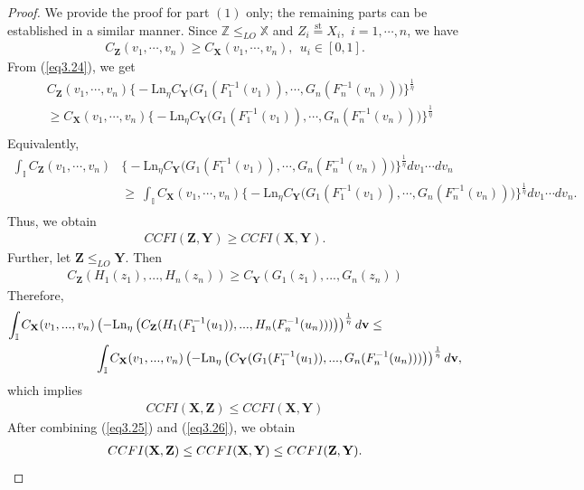 \documentclass[12pt, a4paper]{article}
\numberwithin{equation}{section}
\begin{document}
\begin{proof}
We provide the proof for part $(1)$ only; the remaining parts can be established in a similar manner.
 Since $\mathbb{Z}\le_{LO}\mathbb{X}$ and $Z_i\overset{\mathrm{st}}{=}X_i$,~$i=1,\cdots,n$, we have 
\begin{align}\label{eq3.24}
C_\textbf{Z}(v_1,\cdots,v_n)\ge C_\textbf{X}(v_1,\cdots,v_n),~~u_i\in[0,1].
\end{align}
 From (\ref{eq3.24}), we get
\begin{align*}
& C_\textbf{Z}(v_1,\cdots,v_n)\Big\{-\mathrm{Ln}_\eta C_\textbf{Y}\big(G_1(F^{-1}_1(v_1)),\cdots, G_n(F^{-1}_n(v_n))\big)\Big\}^{\frac{1}{\eta}}\nonumber\\
&\ge C_\textbf{X}(v_1,\cdots,v_n)\Big\{-\mathrm{Ln}_\eta C_\textbf{Y}\big(G_1(F^{-1}_1(v_1)),\cdots, G_n(F^{-1}_n(v_n))\big)\Big\}^{\frac{1}{\eta}}\nonumber\\
\end{align*}
Equivalently,
\begin{align*}
	\int_{\mathbb I}C_\textbf{Z}(v_1,\cdots,v_n)&\Big\{-\mathrm{Ln}_\eta C_\textbf{Y}\big(G_1(F^{-1}_1(v_1)),\cdots, G_n(F^{-1}_n(v_n))\big)\Big\}^{\frac{1}{\eta}}dv_1\cdots dv_n\nonumber\\
	&\ge \ \int_{\mathbb I}C_\textbf{X}(v_1,\cdots,v_n)\Big\{-\mathrm{Ln}_\eta C_\textbf{Y}\big(G_1(F^{-1}_1(v_1)),\cdots, G_n(F^{-1}_n(v_n))\big)\Big\}^{\frac{1}{\eta}}dv_1\cdots dv_n.\nonumber\\
\end{align*}
Thus, we obtain
\begin{align}\label{eq3.25}
	CCFI(\textbf{Z},\textbf{Y})\ge CCFI(\textbf{X},\textbf{Y}).
\end{align}
Further, let $\mathbf Z\leq_{LO}\mathbf Y$. Then
\begin{align*}
	C_{\mathbf Z}(H_1(z_1),...,H_n(z_n))\geq C_{\mathbf Y}(G_1(z_1),...,G_n(z_n))
\end{align*}
Therefore, 
\begin{align*}
	\int_{\mathbb I}C_{\mathbf X}(v_1,...,v_n)&\left(-\mathrm{Ln}_\eta\left(C_{\mathbf Z}(H_1(F_1^{-1}(u_1)),...,H_n(F_n^{-1}(u_n)))\right)\right)^{\frac{1}{\eta}}d\textbf v\leq \\	&\int_{\mathbb I}C_{\mathbf X}(v_1,...,v_n)\left(-\mathrm{Ln}_\eta\left(C_{\mathbf Y}(G_1(F_1^{-1}(u_1)),...,G_n(F_n^{-1}(u_n)))\right)\right)^{\frac{1}{\eta}}d\textbf v,
\end{align*}
which implies 
\begin{align}\label{eq3.26}
	CCFI(\mathbf X,\mathbf Z)\leq CCFI(\mathbf X,\mathbf Y)
\end{align}
After combining (\ref{eq3.25}) and (\ref{eq3.26}), we obtain
\begin{align*}
CCFI(\mathbf X,\mathbf Z)\leq CCFI(\textbf X,\textbf Y)\le CCFI(\mathbf Z,\mathbf Y).
\end{align*}
\end{proof}
\end{document}
